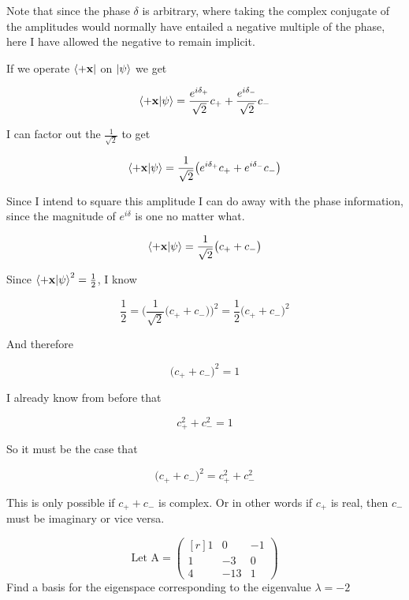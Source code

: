 \documentclass[11pt, oneside]{article}   	%
\begin{document}
Note that since the phase $\delta$ is arbitrary, where taking the complex conjugate of the amplitudes would normally have entailed a negative multiple of the phase, here I have allowed the negative to remain implicit. 
 
 If we operate $\bra{+\textbf{x}}$ on $\ket{\psi}$ we get
 
 \[
 \braket{+\textbf{x}|\psi}= \frac{e^{i\delta_+}}{\sqrt{2}}c_++\frac{e^{i\delta_-}}{\sqrt{2}}c_-
 \]
 
 I can factor out the $\frac{1}{\sqrt{2}}$ to get 
 
 \[ 
 \braket{+\textbf{x}|\psi}= \frac{1}{\sqrt{2}}\big(e^{i\delta_+}c_++e^{i\delta_-}c_-\big)
 \]
 
 Since I intend to square this amplitude I can do away with the phase information, since the magnitude of $e^{i\delta}$ is one no matter what. 
 
 \[
  \braket{+\textbf{x}|\psi}= \frac{1}{\sqrt{2}}\big(c_++c_-\big)
 \]
 
 Since $\braket{+\textbf{x}|\psi}^2=\frac{1}{2}$, I know 
 
 \begin{equation*}
 \frac{1}{2}=\Big(\frac{1}{\sqrt{2}}\big(c_++c_-\big)\Big)^2
 =\frac{1}{2}\big(c_++c_-\big)^2
 \end{equation*}
 
And therefore

\[
\big(c_++c_-\big)^2=1
\]
 
 I already know from before that 
 
 \[
 c_+^2+c_-^2=1
 \]
 
 So it must be the case that 
 
 \[
 \big(c_++c_-\big)^2= c_+^2+c_-^2
 \]
 
 This is only possible if $c_++c_-$ is complex. Or in other words if $c_+$ is real, then $c_-$ must be imaginary or vice versa. 
 
 \clearpage
 
 \begin{center}
 \begin{tcolorbox}[title=5.1.14 \hfill Isaac Baer, halign title=center]
 \[
 \text{Let A}= \begin{pmatrix*}[r]
 1&0&-1\\
 1&-3&0\\
 4&-13&1
 \end{pmatrix*}
 \]
 Find a basis for the eigenspace corresponding to the eigenvalue $\lambda=-2$
 \end{tcolorbox}
 \end{center}
 
\end{document}
